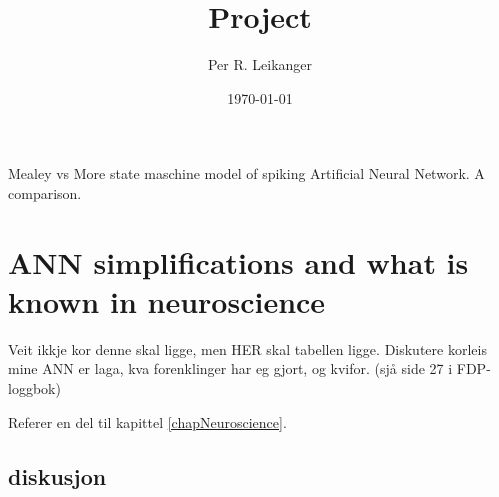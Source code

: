 \documentclass[a4paper,11 pt]{report}
\author{Per R. Leikanger}
\title{Project}
\date{\today}
\begin{document}
   

\maketitle

Mealey vs More state maschine model of spiking Artificial Neural Network. A comparison.

\tableofcontents

\newpage

\newpage



\newpage




\newpage









\chapter{ANN simplifications and what is known in neuroscience}
Veit ikkje kor denne skal ligge, men
HER skal tabellen ligge. Diskutere korleis mine ANN er laga, kva forenklinger har eg gjort, og kvifor. (sjå side 27 i FDP-loggbok)

Referer en del til kapittel \ref{chapNeuroscience}.









\section{diskusjon}


%

\end{document}
